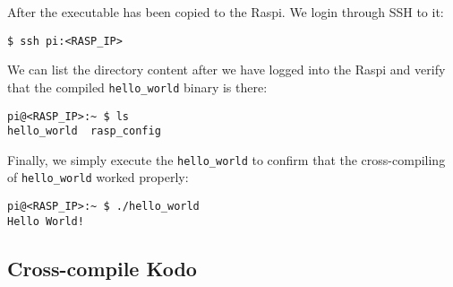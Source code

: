 

After the executable has been copied to the \ac{Raspi}. We login through
\ac{SSH} to it:

\begin{lstlisting}[]
$ ssh pi:<RASP_IP>
\end{lstlisting}
\FloatBarrier
\vspace{-5mm}

We can list the directory content after we have logged into the \ac{Raspi} and
verify that the compiled \texttt{hello\_world} binary is there:

\begin{lstlisting}[]
pi@<RASP_IP>:~ $ ls
hello_world  rasp_config
\end{lstlisting}
\FloatBarrier
\vspace{-5mm}

Finally, we simply execute the \texttt{hello\_world} to confirm that
the cross-compiling of \texttt{hello\_world} worked properly:

\begin{lstlisting}[]
pi@<RASP_IP>:~ $ ./hello_world
Hello World!
\end{lstlisting}
\FloatBarrier
\vspace{-5mm}

\subsection{Cross-compile Kodo}

